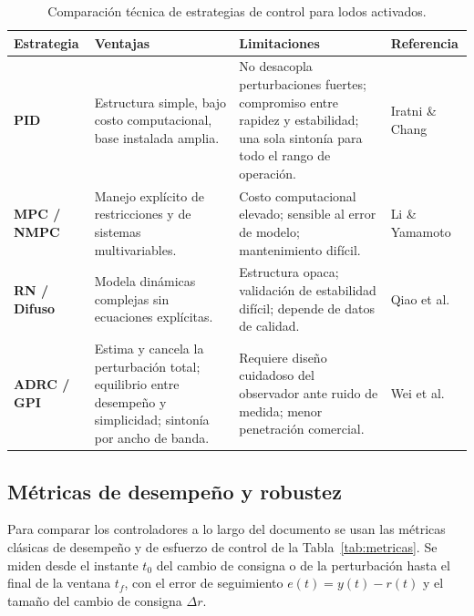\begin{table}[H]
\centering
\caption{Comparación técnica de estrategias de control para lodos activados.}
\label{tab:comparativa_control}
\renewcommand{\arraystretch}{1.35}
\small
\begin{tabular}{|p{2.1cm}|p{4.6cm}|p{4.9cm}|p{2.6cm}|}
\hline
\rowcolor[gray]{0.9}
\textbf{Estrategia} & \textbf{Ventajas} & \textbf{Limitaciones} & \textbf{Referencia} \\ \hline
\textbf{PID} & Estructura simple, bajo costo computacional, base instalada amplia. & No desacopla perturbaciones fuertes; compromiso entre rapidez y estabilidad; una sola sintonía para todo el rango de operación. & Iratni \& Chang \cite{iratni2019advances} \\ \hline
\textbf{MPC / NMPC} & Manejo explícito de restricciones y de sistemas multivariables. & Costo computacional elevado; sensible al error de modelo; mantenimiento difícil. & Li \& Yamamoto \cite{li2017multi} \\ \hline
\textbf{RN / Difuso} & Modela dinámicas complejas sin ecuaciones explícitas. & Estructura opaca; validación de estabilidad difícil; depende de datos de calidad. & Qiao et al. \cite{qiao2014neural} \\ \hline
\textbf{ADRC / GPI} & Estima y cancela la perturbación total; equilibrio entre desempeño y simplicidad; sintonía por ancho de banda. & Requiere diseño cuidadoso del observador ante ruido de medida; menor penetración comercial. & Wei et al. \cite{wei2020disturbance} \\ \hline
\end{tabular}
\end{table}

\subsection{Métricas de desempeño y robustez}
\label{subsec:metricas}

Para comparar los controladores a lo largo del documento se usan las métricas clásicas de desempeño y
de esfuerzo de control de la Tabla~\ref{tab:metricas}. Se miden desde el instante
$t_0$ del cambio de consigna o de la perturbación hasta el final de la ventana $t_f$, con el error de
seguimiento $e(t) = y(t) - r(t)$ y el tamaño del cambio de consigna $\Delta r$.

